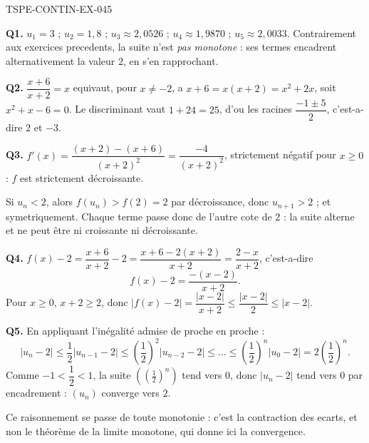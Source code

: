 \begin{corrige}{TSPE-CONTIN-EX-045}

\textbf{Q1.} $u_1 = 3$ ; $u_2 = 1{,}8$ ; $u_3 \approx 2{,}0526$ ; $u_4 \approx 1{,}9870$ ; $u_5 \approx 2{,}0033$. Contrairement aux exercices precedents, la suite n'est \emph{pas monotone} : ses termes encadrent alternativement la valeur $2$, en s'en rapprochant.

\textbf{Q2.} $\dfrac{x+6}{x+2} = x$ equivaut, pour $x
\neq -2$, a $x + 6 = x(x+2) = x^2 + 2x$, soit $x^2 + x - 6 = 0$. Le discriminant vaut $1 + 24 = 25$, d'ou les racines $\dfrac{-1 \pm 5}{2}$, c'est-a-dire $2$ et $-3$.

\textbf{Q3.} $f'(x) = \dfrac{(x+2) - (x+6)}{(x+2)^2} = \dfrac{-4}{(x+2)^2}$, strictement négatif pour $x \geq 0$ : $f$ est strictement décroissante.

Si $u_n < 2$, alors $f(u_n) > f(2) = 2$ par décroissance, donc $u_{n+1} > 2$ ; et symetriquement. Chaque terme passe donc de l'autre cote de $2$ : la suite alterne et ne peut être ni croissante ni décroissante.

\textbf{Q4.} $f(x) - 2 = \dfrac{x+6}{x+2} - 2 = \dfrac{x + 6 - 2(x+2)}{x+2} = \dfrac{2 - x}{x+2}$, c'est-a-dire
\[ f(x) - 2 = \frac{-(x-2)}{x+2}. \]
Pour $x \geq 0$, $x + 2 \geq 2$, donc $\left|f(x) - 2\right| = \dfrac{|x-2|}{x+2} \leq \dfrac{|x-2|}{2} \leq |x-2|$.

\textbf{Q5.} En appliquant l'inégalité admise de proche en proche :
\[ \left|u_n - 2\right| \leq \frac{1}{2}\left|u_{n-1} - 2\right| \leq \left(\frac12\right)^2\left|u_{n-2} - 2\right| \leq \dots \leq \left(\frac12\right)^n\left|u_0 - 2\right| = 2\left(\frac12\right)^n. \]
Comme $-1 < \dfrac12 < 1$, la suite $\left(\left(\tfrac12\right)^n\right)$ tend vers $0$, donc $\left|u_n - 2\right|$ tend vers $0$ par encadrement : $(u_n)$ converge vers $2$.

Ce raisonnement se passe de toute monotonie : c'est la contraction des ecarts, et non le théorème de la limite monotone, qui donne ici la convergence.
\end{corrige}
